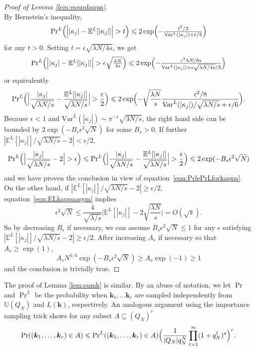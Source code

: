 \documentclass{article}
\theoremstyle{definition}
\renewcommand{\leq}{\leqslant}
\renewcommand{\geq}{\geqslant}
\newcommand{\bsk}{\boldsymbol{k}}
\newcommand{\dunif}{\mathbb{U}}
\newcommand{\e}{\mathbb{E}}
\newcommand{\var}{\mathrm{Var}}
\begin{document}
\begin{proof}[Proof of Lemma \ref{lem:meankappa}]
\begin{equation}
    \end{equation}
    By Bernstein's inequality,
    $$\textstyle{\Pr^L}\Big(\Big||\kappa_j|-\e^L[|\kappa_j|]\Big|>t\Big)\leq 2\exp\Bigl(-\frac{t^2/2}{\var^L(|\kappa_j|)+t/3}\Bigr)$$
    for any $t>0$. Setting $t=\epsilon\sqrt{\lambda N/4s}$, we get
    $$
    \textstyle{\Pr^L}\Big(\Big||\kappa_j|-\e^L[|\kappa_j|]\Big|>\epsilon\sqrt{ \frac{\lambda N}{4s}}\Big)\leq 2\exp\Bigl(-\frac{\epsilon^2\lambda N/8s}{\var^L(|\kappa_j|)+\epsilon\sqrt{\lambda N/4s}/3}\Bigr)
    $$
    or equivalently
        $${\textstyle\Pr}^L\Big(\Big|\frac{|\kappa_j|}{\sqrt{\lambda N/s}}-\frac{\e^L[|\kappa_j|]}{\sqrt{\lambda N/s}}\Big|>\frac{\epsilon}{2}\Big)\leq 2\exp\Bigl(-\sqrt{\frac{\lambda N}{s}}\frac{\epsilon^2/8}{\var^L(|\kappa_j|)/\sqrt{\lambda N/s}+\epsilon/6}\Bigr).$$ 
    Because $\epsilon < 1$ and $\var^L(|\kappa_j|)\sim \pi^{-1}\sqrt{3 N/s} $, the right hand side can be bounded by $2\exp(-B_s \epsilon^2 \sqrt{N})$ for some $B_s>0$. If further $|\e^L[|\kappa_j|]/\sqrt{\lambda N/s}-2|< \epsilon/2$, 
$${\textstyle\Pr}^L \Bigl(\Big|\frac{|\kappa_j|}{\sqrt{\lambda N/s}}-2\Big|>\epsilon\Bigr)\leq {\textstyle\Pr}^L\Big(\Big|\frac{|\kappa_j|}{\sqrt{\lambda N/s}}-\frac{\e^L[|\kappa_j|]}{\sqrt{
\lambda N/s}}\Big|>\frac{\epsilon}{2}\Big)\leq 2\exp(-B_s \epsilon^2 \sqrt{N})$$
and we have proven the conclusion in view of equation~\eqref{eqn:PrlePrLforkappa}.
On the other hand, if $|\e^L[|\kappa_j|]/\sqrt{\lambda N/s}-2|\geq \epsilon/2$, equation~\eqref{eqn:ELkappaasym} implies
$$\epsilon^2\sqrt{N}\leq \frac{4}{\sqrt{\lambda/s}}\Big|\e^L[|\kappa_j|]-2\sqrt{\frac{\lambda N}{s}}\Big|=O(\sqrt{s}).$$
So by decreasing $B_s$ if necessary, we can assume $B_s\epsilon^2\sqrt{N}\leq 1$ for any $\epsilon$ satisfying $|\e^L[|\kappa_j|]/\sqrt{\lambda N/s}-2|\geq \epsilon/2$. After increasing $A_s$ if necessary so that $A_s\geq \exp(1)$,
$$A_sN^{1/4}\exp(-B_s \epsilon^2 \sqrt{N})\geq A_s\exp(-1)\geq 1$$
and the conclusion is trivially true.
\end{proof}

The proof of Lemma \ref{lem:sumk} is similar. By an abuse of notation, we let $\Pr$ and ${\textstyle\Pr}^L$ be the probability when $\bsk_1,...\bsk_r$ are sampled independently from $\dunif( Q_N)$ and $L(\bsk)$, respectively. An analogous argument using the importance sampling trick shows for any subset $A \subseteq (Q_N)^r$
\begin{equation}\label{eqn:rversionPrlePrL}
    \Pr((\bsk_1,\dots,\bsk_r)\in A)\leq {\textstyle\Pr}^L((\bsk_1,\dots,\bsk_r)\in A)\Bigl(\frac{1}{|Q_N|q_N^N}\prod_{\ell=1}^\infty (1+q_N^\ell)^s\Bigr)^r.
\end{equation}
\end{document}

